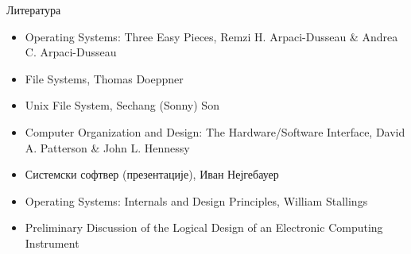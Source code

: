 \documentclass[xcolor=table]{beamer}
\begin{document}
    \begin{frame}{Литература}
        \begin{itemize}
            \item Operating Systems: Three Easy Pieces, Remzi H. Arpaci-Dusseau \& Andrea C. Arpaci-Dusseau
            \item File Systems, Thomas Doeppner
            \item Unix File System, Sechang (Sonny) Son
            \item Computer Organization and Design: The Hardware/Software Interface, David A. Patterson \& John L. Hennessy
            \item Системски софтвер (презентације), Иван Нејгебауер
            \item Operating Systems: Internals and Design Principles, William Stallings
            \item Preliminary Discussion of the Logical Design of an Electronic Computing Instrument
        \end{itemize}
    \end{frame}
\end{document}
